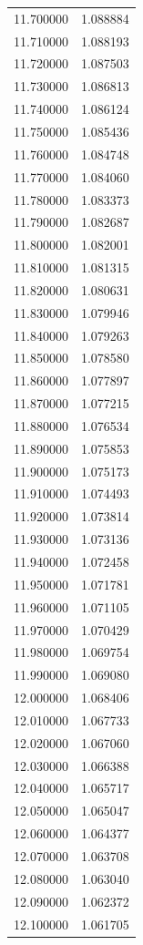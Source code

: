 \begin{tabular}{rr}
11.700000 & 1.088884 \\
11.710000 & 1.088193 \\
11.720000 & 1.087503 \\
11.730000 & 1.086813 \\
11.740000 & 1.086124 \\
11.750000 & 1.085436 \\
11.760000 & 1.084748 \\
11.770000 & 1.084060 \\
11.780000 & 1.083373 \\
11.790000 & 1.082687 \\
11.800000 & 1.082001 \\
11.810000 & 1.081315 \\
11.820000 & 1.080631 \\
11.830000 & 1.079946 \\
11.840000 & 1.079263 \\
11.850000 & 1.078580 \\
11.860000 & 1.077897 \\
11.870000 & 1.077215 \\
11.880000 & 1.076534 \\
11.890000 & 1.075853 \\
11.900000 & 1.075173 \\
11.910000 & 1.074493 \\
11.920000 & 1.073814 \\
11.930000 & 1.073136 \\
11.940000 & 1.072458 \\
11.950000 & 1.071781 \\
11.960000 & 1.071105 \\
11.970000 & 1.070429 \\
11.980000 & 1.069754 \\
11.990000 & 1.069080 \\
12.000000 & 1.068406 \\
12.010000 & 1.067733 \\
12.020000 & 1.067060 \\
12.030000 & 1.066388 \\
12.040000 & 1.065717 \\
12.050000 & 1.065047 \\
12.060000 & 1.064377 \\
12.070000 & 1.063708 \\
12.080000 & 1.063040 \\
12.090000 & 1.062372 \\
12.100000 & 1.061705 \\

\end{tabular}
